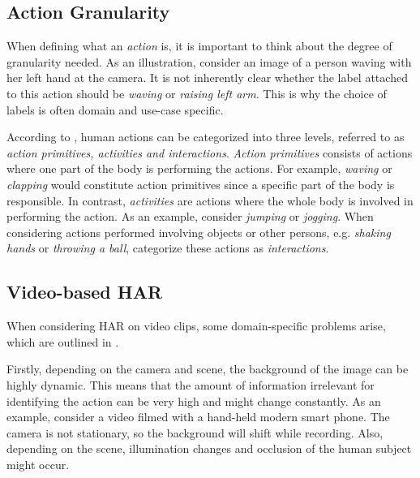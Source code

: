 \subsection{Action Granularity}
When defining what an \textit{action} is, it is important to think about the degree of granularity needed.
As an illustration, consider an image of a person waving with her left hand at the camera.
It is not inherently clear whether the label attached to this action should be \textit{waving} or \textit{raising left arm}.
This is why the choice of labels is often domain and use-case specific.

According to \cite{zhang_review_2017}, human actions can be categorized into three levels, referred to as \textit{action primitives, activities and interactions}.
\textit{Action primitives} consists of actions where one part of the body is performing the actions.
For example, \textit{waving} or \textit{clapping} would constitute action primitives since a specific part of the body is responsible.
In contrast, \textit{activities} are actions where the whole body is involved in performing the action.
As an example, consider \textit{jumping} or \textit{jogging}.
When considering actions performed involving objects or other persons, e.g. \textit{shaking hands} or \textit{throwing a ball}, \cite{zhang_review_2017} categorize these actions as \textit{interactions}.

\subsection{Video-based HAR}
\label{sec:video-based-har}
When considering HAR on video clips, some domain-specific problems arise, which are outlined in \cite{zhang_review_2017}.

Firstly, depending on the camera and scene, the background of the image can be highly dynamic.
This means that the amount of information irrelevant for identifying the action can be very high and might change constantly.
As an example, consider a video filmed with a hand-held modern smart phone.
The camera is not stationary, so the background will shift while recording.
Also, depending on the scene, illumination changes and occlusion of the human subject might occur.

